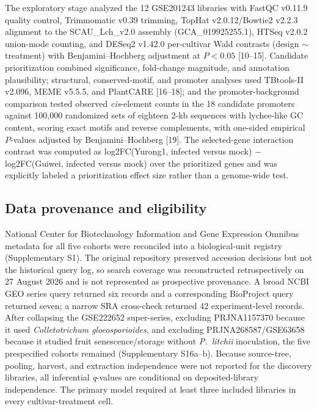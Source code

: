 \documentclass[referee,pdflatex,sn-basic,Numbered]{sn-jnl}
\newcommand{\Pl}{\textit{P.~litchii}}
\newcommand{\q}{\textit{q}}
\begin{document}
The exploratory stage analyzed the 12 GSE201243 libraries with FastQC v0.11.9 quality control, Trimmomatic v0.39 trimming, TopHat v2.0.12/Bowtie2 v2.2.3 alignment to the SCAU\_Lch\_v2.0 assembly (GCA\_019925255.1), HTSeq v2.0.2 union-mode counting, and DESeq2 v1.42.0 per-cultivar Wald contrasts (design $\sim$ treatment) with Benjamini--Hochberg adjustment at $P<0.05$ [10--15]. Candidate prioritization combined significance, fold-change magnitude, and annotation plausibility; structural, conserved-motif, and promoter analyses used TBtools-II v2.096, MEME v5.5.5, and PlantCARE [16--18]; and the promoter-background comparison tested observed \textit{cis}-element counts in the 18 candidate promoters against 100,000 randomized sets of eighteen 2-kb sequences with lychee-like GC content, scoring exact motifs and reverse complements, with one-sided empirical $P$-values adjusted by Benjamini--Hochberg [19]. The selected-gene interaction contrast was computed as log2FC(Yurong1, infected versus mock) $-$ log2FC(Guiwei, infected versus mock) over the prioritized genes and was explicitly labeled a prioritization effect size rather than a genome-wide test.

\subsection{Data provenance and eligibility}

National Center for Biotechnology Information and Gene Expression Omnibus metadata for all five cohorts were reconciled into a biological-unit registry (Supplementary S1). The original repository preserved accession decisions but not the historical query log, so search coverage was reconstructed retrospectively on 27 August 2026 and is not represented as prospective provenance. A broad NCBI GEO series query returned six records and a corresponding BioProject query returned seven; a narrow SRA cross-check returned 42 experiment-level records. After collapsing the GSE222652 super-series, excluding PRJNA1157370 because it used \textit{Colletotrichum gloeosporioides}, and excluding PRJNA268587/GSE63658 because it studied fruit senescence/storage without \Pl{} inoculation, the five prespecified cohorts remained (Supplementary S16a--b). Because source-tree, pooling, harvest, and extraction independence were not reported for the discovery libraries, all inferential \q-values are conditional on deposited-library independence. The primary model required at least three included libraries in every cultivar-treatment cell.
\end{document}
